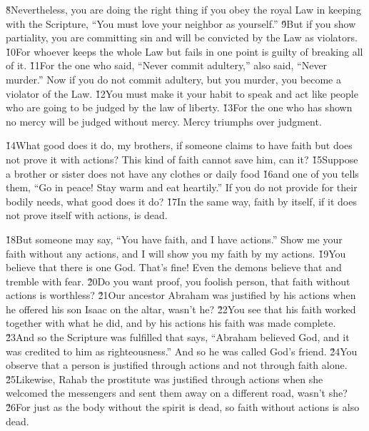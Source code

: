 \v{8}Nevertheless, you are doing the right thing if you obey the royal Law in keeping with the Scripture, ``You must love your neighbor as yourself.'' \v{9}But if you show partiality, you are committing sin and will be convicted by the Law as violators. \v{10}For whoever keeps the whole Law but fails in one point is guilty of breaking all of it. \v{11}For the one who said, ``Never commit adultery,'' also said, ``Never murder.'' Now if you do not commit adultery, but you murder, you become a violator of the Law. \v{12}You must make it your habit to speak and act like people who are going to be judged by the law of liberty. \v{13}For the one who has shown no mercy will be judged without mercy. Mercy triumphs over judgment.

\v{14}What good does it do, my brothers, if someone claims to have faith but does not prove it with actions? This kind of faith cannot save him, can it? \v{15}Suppose a brother or sister does not have any clothes or daily food \v{16}and one of you tells them, ``Go in peace! Stay warm and eat heartily.'' If you do not provide for their bodily needs, what good does it do? \v{17}In the same way, faith by itself, if it does not prove itself with actions, is dead.

\v{18}But someone may say, ``You have faith, and I have actions.'' Show me your faith without any actions, and I will show you my faith by my actions. \v{19}You believe that there is one God. That's fine! Even the demons believe that and tremble with fear. \v{20}Do you want proof, you foolish person, that faith without actions is worthless? \v{21}Our ancestor Abraham was justified by his actions when he offered his son Isaac on the altar, wasn't he? \v{22}You see that his faith worked together with what he did, and by his actions his faith was made complete. \v{23}And so the Scripture was fulfilled that says, ``Abraham believed God, and it was credited to him as righteousness.'' And so he was called God's friend. \v{24}You observe that a person is justified through actions and not through faith alone. \v{25}Likewise, Rahab the prostitute was justified through actions when she welcomed the messengers and sent them away on a different road, wasn't she? \v{26}For just as the body without the spirit is dead, so faith without actions is also dead.

